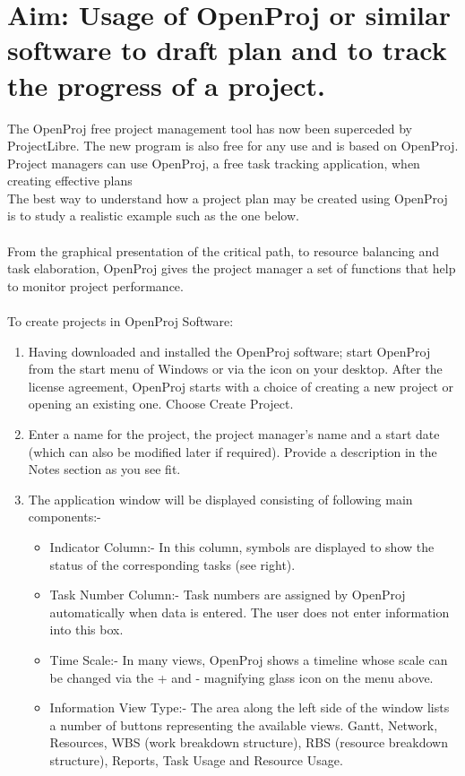 \section*{\fontsize{16}{14}\selectfont Aim: Usage of OpenProj or similar software to draft plan and to track the progress of a project.}

The OpenProj free project management tool has now been superceded by ProjectLibre. The new program is also free for any use and is based on OpenProj. Project managers can use OpenProj, a free task tracking application, when creating effective plans\\
The best way to understand how a project plan may be created using OpenProj is to study a realistic example such as the one below.\\\\
From the graphical presentation of the critical path, to resource balancing and task elaboration, OpenProj gives the project manager a set of functions that help to monitor project performance.\\\\
To create projects in OpenProj Software:
\begin{enumerate}

\item Having downloaded and installed the OpenProj software; start OpenProj from the start menu of Windows or via the icon on your desktop. After the license agreement, OpenProj starts with a choice of creating a new project or opening an existing one. Choose Create Project.



\item Enter a name for the project, the project manager's name and a start date (which can also be modified later if required). Provide a description in the Notes section as you see fit.

\item The application window will be displayed consisting of following main components:- 
\begin{itemize}
\item{Indicator Column}:- In this column, symbols are displayed to show the status of the corresponding tasks (see right). 

\item{Task Number Column}:- Task numbers are assigned by OpenProj automatically when data is entered. The user does not enter information into this box. 

\item{Time Scale}:- In many views, OpenProj shows a timeline whose scale can be changed via the + and - magnifying glass icon on the menu above. 

\item{Information View Type}:- The area along the left side of the window lists a number of buttons representing the available views. Gantt, Network, Resources, WBS (work breakdown structure), RBS (resource breakdown structure), Reports, Task Usage and Resource Usage.  
\end{itemize}
\end{enumerate}
